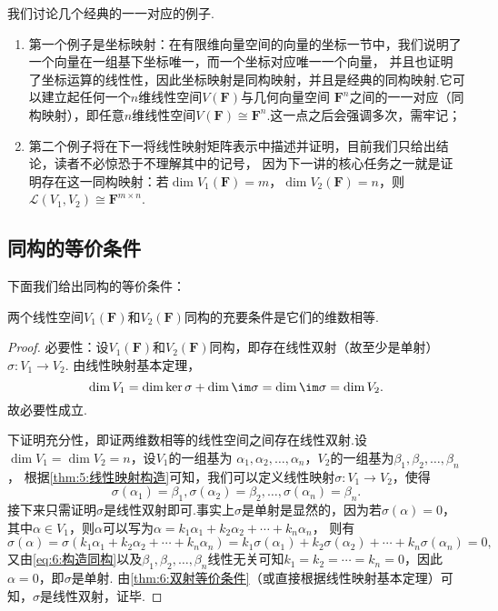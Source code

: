 我们讨论几个经典的一一对应的例子.
\begin{enumerate}
    \item 第一个例子是坐标映射：在有限维向量空间的向量的坐标一节中，我们说明了一个向量在一组基下坐标唯一，而一个坐标对应唯一一个向量，
    并且也证明了坐标运算的线性性，因此坐标映射是同构映射，并且是经典的同构映射.它可以建立起任何一个$n$维线性空间$V(\mathbf{F})$与几何向量空间
    $\mathbf{F}^n$之间的一一对应（同构映射），即任意$n$维线性空间$V(\mathbf{F})\cong\mathbf{F}^n$.这一点之后会强调多次，需牢记；

    \item 第二个例子将在下一将线性映射矩阵表示中描述并证明，目前我们只给出结论，读者不必惊恐于不理解其中的记号，
    因为下一讲的核心任务之一就是证明存在这一同构映射：若$\dim V_1(\mathbf{F})=m$，$\dim V_2(\mathbf{F})=n$，则
    $\mathcal{L}(V_1,V_2) \cong \mathbf{F}^{m \times n}$.
\end{enumerate}

\subsection{同构的等价条件}
下面我们给出同构的等价条件：
\begin{theorem}\label{thm:6:同构的等价条件}
    两个线性空间$V_1(\mathbf{F})$和$V_2(\mathbf{F})$同构的充要条件是它们的维数相等.
\end{theorem}

\begin{proof}
    必要性：设$V_1(\mathbf{F})$和$V_2(\mathbf{F})$同构，即存在线性双射（故至少是单射）$\sigma:V_1\to V_2$.
    由线性映射基本定理，
    \[\dim V_1=\dim\ker\sigma+\dim\im\sigma=\dim\im\sigma=\dim V_2.\]
    故必要性成立.

    下证明充分性，即证两维数相等的线性空间之间存在线性双射.设$\dim V_1=\dim V_2=n$，设$V_1$的一组基为
    $\alpha_1,\alpha_2,\ldots,\alpha_n$，$V_2$的一组基为$\beta_1,\beta_2,\ldots,\beta_n$，
    根据\autoref{thm:5:线性映射构造}可知，我们可以定义线性映射$\sigma:V_1\to V_2$，使得
    \begin{equation}\label{eq:6:构造同构}
        \sigma(\alpha_1)=\beta_1,\sigma(\alpha_2)=\beta_2,\ldots,\sigma(\alpha_n)=\beta_n.
    \end{equation}
    接下来只需证明$\sigma$是线性双射即可.事实上$\sigma$是单射是显然的，因为若$\sigma(\alpha)=0$，
    其中$\alpha\in V_1$，则$\alpha$可以写为$\alpha=k_1\alpha_1+k_2\alpha_2+\cdots+k_n\alpha_n$，
    则有
    \[\sigma(\alpha)=\sigma(k_1\alpha_1+k_2\alpha_2+\cdots+k_n\alpha_n)=k_1\sigma(\alpha_1)+k_2\sigma(\alpha_2)+\cdots+k_n\sigma(\alpha_n)=0,\]
    又由\autoref{eq:6:构造同构}以及$\beta_1,\beta_2,\ldots,\beta_n$线性无关可知$k_1=k_2=\cdots=k_n=0$，因此$\alpha=0$，即$\sigma$是单射.
    由\autoref{thm:6:双射等价条件}（或直接根据线性映射基本定理）可知，$\sigma$是线性双射，证毕.
\end{proof}

